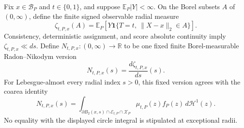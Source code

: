 Fix \(x\in\mathcal B_P\) and \(t\in\{0,1\}\), and suppose \(\mathbb E_P|Y|<\infty\).  On the Borel subsets \(A\) of \((0,\infty)\), define the finite signed observable radial measure
\[
 \zeta_{t,P,x}(A)
 =\mathbb E_P\!\left[Y\mathbf 1\{T=t,\ \lVert X-x\rVert_2\in A\}\right].
\]
Consistency, deterministic assignment, and score absolute continuity imply \(\zeta_{t,P,x}\ll ds\).  Define \(N_{t,P,x}:(0,\infty)\to\mathbb R\) to be one fixed finite Borel-measurable Radon--Nikodym version
\[
 N_{t,P,x}(s)=\frac{d\zeta_{t,P,x}}{ds}(s).
\]
For Lebesgue-almost every radial index \(s>0\), this fixed version agrees with the coarea identity
\[
 N_{t,P,x}(s)
 =\int_{\partial B_2(x,s)\cap\mathcal E_{t,P}\cap\mathcal X_P}
 \mu_{t,P}(z)f_P(z)\,d\mathcal H^1(z).
\]
No equality with the displayed circle integral is stipulated at exceptional radii.